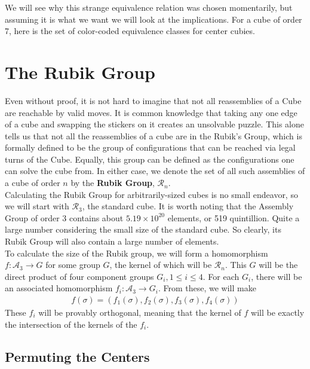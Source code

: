 \documentclass[10pt,letterpaper]{report}
\begin{document}
We will see why this strange equivalence relation was chosen momentarily, but assuming it is what we want we will look at the implications.  For a cube of order 7, here is the set of color-coded equivalence classes for center cubies.

\section{The Rubik Group}
Even without proof, it is not hard to imagine that not all reassemblies of a Cube are reachable by valid moves.  It is common knowledge that taking any one edge of a cube and swapping the stickers on it creates an unsolvable puzzle.  This alone tells us that not all the reassemblies of a cube are in the Rubik's Group, which is formally defined to be the group of configurations that can be reached via legal turns of the Cube.  Equally, this group can be defined as the configurations one can solve the cube from.  In either case, we denote the set of all such assemblies of a cube of order $n$ by the \textbf{Rubik Group}, $\mathcal{R}_n$.  \\

Calculating the Rubik Group for arbitrarily-sized cubes is no small endeavor, so we will start with $\mathcal{R}_3$, the standard cube.  It is worth noting that the Assembly Group of order 3 contains about $5.19 \times 10^{20}$ elements, or 519 quintillion.  Quite a large number considering the small size of the standard cube.  So clearly, its Rubik Group will also contain a large number of elements. \\

To calculate the size of the Rubik group, we will form a homomorphism $f : \mathcal{A}_3 \rightarrow G$ for some group $G$, the kernel of which will be $\mathcal{R}_n$.  This $G$ will be the direct product of four component groups $G_i, 1 \leq i \leq 4$.  For each $G_i$, there will be an associated homomorphism $f_i : \mathcal{A}_3 \rightarrow G_i$.  From these, we will make \begin{align*}
f(\sigma) = (f_1(\sigma), f_2(\sigma), f_3(\sigma), f_4(\sigma))
\end{align*}
These $f_i$ will be provably orthogonal, meaning that the kernel of $f$ will be exactly the intersection of the kernels of the $f_i$.

\subsection{Permuting the Centers}
\end{document}
